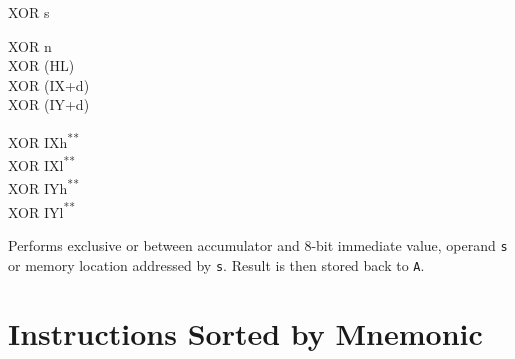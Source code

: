 \documentclass[12pt,twoside,openright,a4paper]{book}
\newcommand{\UNDOC}{\textnormal{\textsuperscript{**}}}
\begin{document}
\begin{basedescript}{
	\desclabelstyle{\multilinelabel}
	\desclabelwidth{3cm}}
\begin{detailitem}{XOR s}
\begin{DetailVariants}
			\columnbreak
			XOR n\\
			XOR (HL)\\
			XOR (IX+d)\\
			XOR (IY+d)

			\columnbreak
			XOR IXh\UNDOC\\
			XOR IXl\UNDOC\\
			XOR IYh\UNDOC\\
			XOR IYl\UNDOC
		\end{DetailVariants}

		Performs exclusive or between accumulator and 8-bit immediate value, operand {\tt s} or memory location addressed by {\tt s}. Result is then stored back to {\tt A}.

		\begin{DetailEffects}[p]
		\end{DetailEffects}
						
		\begin{DetailTiming}
		\end{DetailTiming}

	\end{detailitem}

\end{basedescript}



\appendix


\chapter{Instructions Sorted by Mnemonic}
\end{document}
